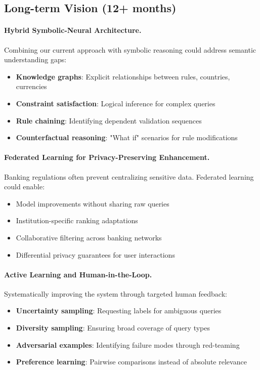 \subsection{Long-term Vision (12+ months)}

\paragraph{Hybrid Symbolic-Neural Architecture.} Combining our current approach with symbolic reasoning could address semantic understanding gaps:
\begin{itemize}[leftmargin=*,itemsep=2pt,topsep=2pt]
 \item \textbf{Knowledge graphs}: Explicit relationships between rules, countries, currencies
 \item \textbf{Constraint satisfaction}: Logical inference for complex queries
 \item \textbf{Rule chaining}: Identifying dependent validation sequences
 \item \textbf{Counterfactual reasoning}: "What if" scenarios for rule modifications
\end{itemize}

\paragraph{Federated Learning for Privacy-Preserving Enhancement.} Banking regulations often prevent centralizing sensitive data. Federated learning could enable:
\begin{itemize}[leftmargin=*,itemsep=2pt,topsep=2pt]
 \item Model improvements without sharing raw queries
 \item Institution-specific ranking adaptations
 \item Collaborative filtering across banking networks
 \item Differential privacy guarantees for user interactions
\end{itemize}

\paragraph{Active Learning and Human-in-the-Loop.} Systematically improving the system through targeted human feedback:
\begin{itemize}[leftmargin=*,itemsep=2pt,topsep=2pt]
 \item \textbf{Uncertainty sampling}: Requesting labels for ambiguous queries
 \item \textbf{Diversity sampling}: Ensuring broad coverage of query types
 \item \textbf{Adversarial examples}: Identifying failure modes through red-teaming
 \item \textbf{Preference learning}: Pairwise comparisons instead of absolute relevance
\end{itemize}

